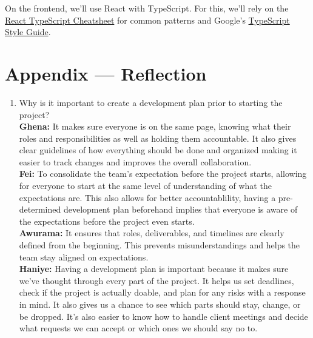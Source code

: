 \documentclass{article}
\begin{document}
On the frontend, we’ll use React with TypeScript. For this, we’ll rely on the \href{https://react-typescript-cheatsheet.netlify.app/}{React TypeScript Cheatsheet} for common patterns and Google’s \href{https://google.github.io/styleguide/tsguide.html}{TypeScript Style Guide}.

\newpage{}

\section*{Appendix --- Reflection}



\begin{enumerate}
    \item Why is it important to create a development plan prior to starting the
    project? \\
    \textbf{Ghena: } It makes sure everyone is on the same page, knowing what their roles and responsibilities as well as holding them accountable. It also gives clear guidelines of how everything should be done and organized making it easier to track changes and improves the overall collaboration.
    \\\textbf{Fei:} To consolidate the team’s expectation before the project starts, allowing for everyone to start at the same level of understanding of what the expectations are. This also allows for better accountablility, having a pre-determined development plan beforehand implies that everyone is aware of the expectations before the project even starts.
    \\\textbf{Awurama:} It ensures that roles, deliverables, and timelines are clearly defined 
    from the beginning. This prevents misunderstandings and helps the team stay aligned 
    on expectations.
    \\\textbf{Haniye:} Having a development plan is important because it makes sure we’ve thought through every part of the project. It helps us set deadlines, check if the project is actually doable, and plan for any risks with a response in mind. It also gives us a chance to see which parts should stay, change, or be dropped. It’s also easier to know how to handle client meetings and decide what requests we can accept or which ones we should say no to.


\end{enumerate}
\end{document}
